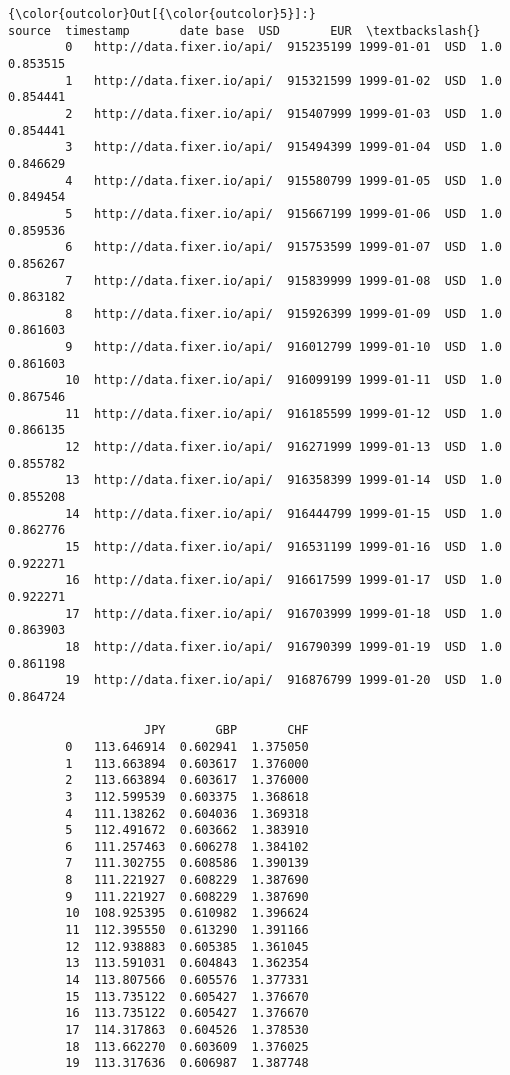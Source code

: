 \documentclass[11pt]{article}
\begin{document}
\begin{Verbatim}[commandchars=\\\{\}]
{\color{outcolor}Out[{\color{outcolor}5}]:}                        source  timestamp       date base  USD       EUR  \textbackslash{}
        0   http://data.fixer.io/api/  915235199 1999-01-01  USD  1.0  0.853515   
        1   http://data.fixer.io/api/  915321599 1999-01-02  USD  1.0  0.854441   
        2   http://data.fixer.io/api/  915407999 1999-01-03  USD  1.0  0.854441   
        3   http://data.fixer.io/api/  915494399 1999-01-04  USD  1.0  0.846629   
        4   http://data.fixer.io/api/  915580799 1999-01-05  USD  1.0  0.849454   
        5   http://data.fixer.io/api/  915667199 1999-01-06  USD  1.0  0.859536   
        6   http://data.fixer.io/api/  915753599 1999-01-07  USD  1.0  0.856267   
        7   http://data.fixer.io/api/  915839999 1999-01-08  USD  1.0  0.863182   
        8   http://data.fixer.io/api/  915926399 1999-01-09  USD  1.0  0.861603   
        9   http://data.fixer.io/api/  916012799 1999-01-10  USD  1.0  0.861603   
        10  http://data.fixer.io/api/  916099199 1999-01-11  USD  1.0  0.867546   
        11  http://data.fixer.io/api/  916185599 1999-01-12  USD  1.0  0.866135   
        12  http://data.fixer.io/api/  916271999 1999-01-13  USD  1.0  0.855782   
        13  http://data.fixer.io/api/  916358399 1999-01-14  USD  1.0  0.855208   
        14  http://data.fixer.io/api/  916444799 1999-01-15  USD  1.0  0.862776   
        15  http://data.fixer.io/api/  916531199 1999-01-16  USD  1.0  0.922271   
        16  http://data.fixer.io/api/  916617599 1999-01-17  USD  1.0  0.922271   
        17  http://data.fixer.io/api/  916703999 1999-01-18  USD  1.0  0.863903   
        18  http://data.fixer.io/api/  916790399 1999-01-19  USD  1.0  0.861198   
        19  http://data.fixer.io/api/  916876799 1999-01-20  USD  1.0  0.864724   
        
                   JPY       GBP       CHF  
        0   113.646914  0.602941  1.375050  
        1   113.663894  0.603617  1.376000  
        2   113.663894  0.603617  1.376000  
        3   112.599539  0.603375  1.368618  
        4   111.138262  0.604036  1.369318  
        5   112.491672  0.603662  1.383910  
        6   111.257463  0.606278  1.384102  
        7   111.302755  0.608586  1.390139  
        8   111.221927  0.608229  1.387690  
        9   111.221927  0.608229  1.387690  
        10  108.925395  0.610982  1.396624  
        11  112.395550  0.613290  1.391166  
        12  112.938883  0.605385  1.361045  
        13  113.591031  0.604843  1.362354  
        14  113.807566  0.605576  1.377331  
        15  113.735122  0.605427  1.376670  
        16  113.735122  0.605427  1.376670  
        17  114.317863  0.604526  1.378530  
        18  113.662270  0.603609  1.376025  
        19  113.317636  0.606987  1.387748  
\end{Verbatim}
            
\end{document}
